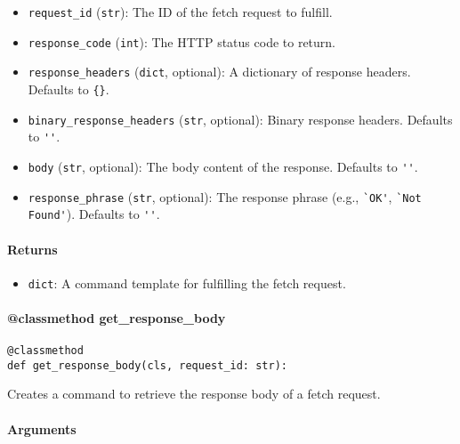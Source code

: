 \documentclass{article}
\begin{document}
\begin{itemize}
    \item \lstinline[style=pythonstyle]|request_id| (\lstinline[style=pythonstyle]|str|): The ID of the fetch request to fulfill.
    \item \lstinline[style=pythonstyle]|response_code| (\lstinline[style=pythonstyle]|int|): The HTTP status code to return.
    \item \lstinline[style=pythonstyle]|response_headers| (\lstinline[style=pythonstyle]|dict|, optional): A dictionary of response headers. Defaults to \lstinline[style=pythonstyle]|{}|.
    \item \lstinline[style=pythonstyle]|binary_response_headers| (\lstinline[style=pythonstyle]|str|, optional): Binary response headers. Defaults to \lstinline[style=pythonstyle]|''|.
    \item \lstinline[style=pythonstyle]|body| (\lstinline[style=pythonstyle]|str|, optional): The body content of the response. Defaults to \lstinline[style=pythonstyle]|''|.
    \item \lstinline[style=pythonstyle]|response_phrase| (\lstinline[style=pythonstyle]|str|, optional): The response phrase (e.g., \lstinline[style=pythonstyle]|`OK'|, \lstinline[style=pythonstyle]|`Not Found'|). Defaults to \lstinline[style=pythonstyle]|''|.
\end{itemize}

\paragraph{Returns}

\begin{itemize}
    \item \lstinline[style=pythonstyle]|dict|: A command template for fulfilling the fetch request.
\end{itemize}

\paragraph{@classmethod get\_response\_body}

\begin{lstlisting}[style=pythonstyle]
@classmethod
def get_response_body(cls, request_id: str):
\end{lstlisting}

\noindent Creates a command to retrieve the response body of a fetch request.

\paragraph{Arguments}
\end{document}

